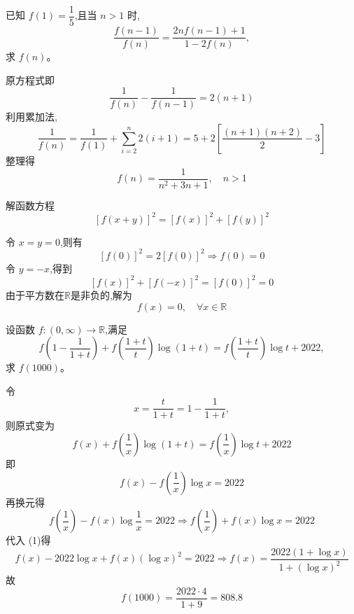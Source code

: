 \begin{questions}
    \question 已知 $f(1) = \dfrac{1}{5}$,且当 $n > 1$ 时,
    \[
    \frac{f(n-1)}{f(n)} = \frac{2nf(n-1)+1}{1-2f(n)},
    \]
    求 $f(n)$。
    \begin{solution}
        原方程式即 
        \[
        \frac{1}{f(n)} - \frac{1}{f(n-1)} = 2(n+1)
        \]
        利用累加法,
        \[
        \frac{1}{f(n)} = \frac{1}{f(1)} + \sum_{i=2}^{n} 2(i+1) = 5 + 2\left[\frac{(n+1)(n+2)}{2}-3\right]
        \]
        整理得 
        \[
        f(n) = \frac{1}{n^2 + 3n + 1},\quad n > 1
        \]
    \end{solution}

    \question 解函数方程 
    \[
    [f(x+y)]^2 = [f(x)]^2 + [f(y)]^2
    \]
    \begin{solution}
        令 $x = y = 0$,则有 
        \[
        [f(0)]^2 = 2[f(0)]^2 \Rightarrow f(0) = 0
        \]
        令 $y = -x$,得到 
        \[
        [f(x)]^2 + [f(-x)]^2 = [f(0)]^2 = 0
        \]
        由于平方数在$\mathbb{R}$是非负的,解为
        \[
        f(x) = 0,\quad  \forall x \in \mathbb{R}
        \]
    \end{solution}

    \question 设函数 $f:(0,\infty)\rightarrow\mathbb{R}$,满足
    \[
    f\left(1-\frac{1}{1+t}\right) + f\left(\frac{1+t}{t}\right)\log(1+t) = f\left(\frac{1+t}{t}\right)\log t + 2022,
    \]
    求 $f(1000)$。
    \begin{solution}
        令 
        \[x = \frac{t}{1+t} = 1 - \frac{1}{1+t},
        \]
        则原式变为
        \[
        f(x) + f\left(\frac{1}{x}\right) \log(1+t) = f\left(\frac{1}{x}\right) \log t + 2022
        \]
        即
        \[
        f(x) - f\left(\frac{1}{x}\right) \log x = 2022 \tag{1}
        \]
        再换元得
        \[
        f\left(\frac{1}{x}\right) - f(x)\log \frac{1}{x} = 2022 \Rightarrow f\left(\frac{1}{x}\right) + f(x) \log x = 2022
        \]
        代入 (1)得
        \[
        f(x) - 2022 \log x + f(x)(\log x)^2 = 2022 \Rightarrow f(x) = \frac{2022 (1 + \log x)}{1 + (\log x)^2}
        \]
        故
        \[
        f(1000) = \frac{2022 \cdot 4}{1 + 9} = 808.8
        \]
    \end{solution}


\end{questions}
